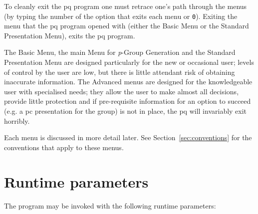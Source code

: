 \documentclass[12pt]{article}
\begin{document}
To cleanly exit the pq program one must retrace one's path through the menus
(by typing the number of the option that exits each menu or \texttt{0}).
Exiting the menu that the pq program opened with (either the Basic Menu
or the Standard Presentation Menu), exits the pq program.

The Basic Menu, the main Menu for {\it p}-Group Generation and
the Standard Presentation Menu
are designed particularly for the new or occasional user; 
levels of control by the user are low, but there is little
attendant risk of obtaining inaccurate information. The Advanced menus
are designed for the knowledgeable user with specialised needs; they
allow the user to make almost all decisions, provide little protection
and if pre-requisite information for an option to succeed 
(e.g. a pc presentation for the group) is not in place, the pq will
invariably exit horribly.

Each menu is discussed in more detail later. See
Section~\ref{sec:conventions} for the conventions 
that apply to these menus. 

\pagebreak
\section{Runtime parameters}\label{sec:runtime}
The program may be invoked with the following runtime parameters: 
\end{document}
